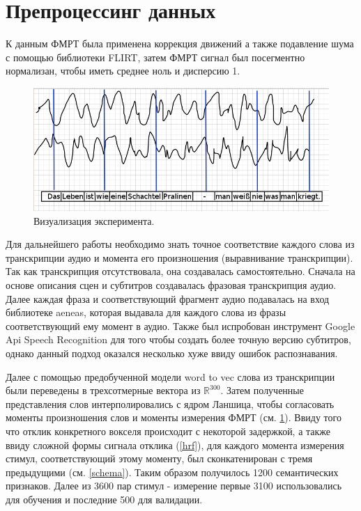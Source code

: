 \documentclass[pdftex,ptm,12pt,a4paper]{report}
\theoremstyle{definition}
\begin{document}
\section{Препроцессинг данных}

К данным ФМРТ была применена коррекция движений а также подавление шума с помощью библиотеки FLIRT, затем ФМРТ сигнал был посегментно нормализан, чтобы иметь среднее ноль и дисперсию 1. 

\begin{figure}[h]
\includegraphics[scale=0.5]{images/word_forrest.png}
\centering
\caption{Визуализация эксперимента.}
\label{interpolation}
\end{figure}

Для дальнейшего работы необходимо знать точное соответствие каждого слова из транскрипции аудио и момента его произношения (выравнивание транскрипции). Так как транскрипция отсутствовала, она создавалась самостоятельно. Сначала на основе описания сцен и субтитров создавалась фразовая транскрипция аудио. Далее каждая фраза и соответствующий фрагмент аудио подавалась на вход библиотеке aeneas, которая выдавала для каждого слова из фразы соответствующий ему момент в аудио. Также был испробован инструмент Google Api Speech Recognition для того чтобы создать более точную версию субтитров, однако данный подход оказался несколько хуже ввиду ошибок распознавания. 

Далее с помощью предобученной модели word to vec слова из транскрипции были переведены в трехсотмерные вектора из $\mathbb{R}^{300}.$ Затем полученные представления слов интерполировались с ядром Ланшица, чтобы согласовать моменты произношения слов и моменты измерения ФМРТ (см. \ref{interpolation}). Ввиду того что отклик конкретного вокселя происходит с некоторой задержкой, а также ввиду сложной формы сигнала отклика (\ref{hrf}), для каждого момента измерения стимул, соответствующий этому моменту, был сконкатенирован с тремя предыдущими (см. \ref{schema}). Таким образом получилось 1200 семантических признаков. Далее из 3600 пар стимул - измерение первые 3100 использовались для обучения и последние 500 для валидации.
\end{document}
